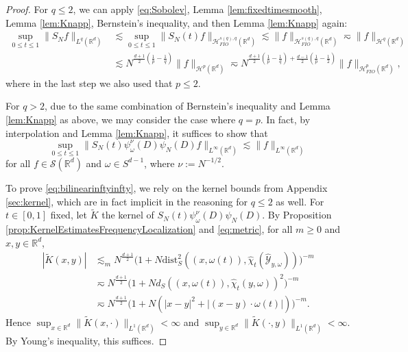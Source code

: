 \documentclass{amsart}
\numberwithin{equation}{section}
\theoremstyle{definition}
\newcommand{\R}{\mathbb{R}}
\newcommand{\Rd}{\mathbb{R}^{d}}
\newcommand {\HT}{\mathcal{H}}
\newcommand {\Sw}{\mathcal{S}}
\newcommand {\w}{\omega}
\begin{document}
\begin{proof}
For $q\leq 2$, we can apply \eqref{eq:Sobolev}, Lemma \ref{lem:fixedtimesmooth}, Lemma \ref{lem:Knapp}, Bernstein's inequality, and then Lemma \ref{lem:Knapp} again:
\begin{align*}
\sup_{0\leq t\leq 1}\| S_{N}f\|_{L^{q}(\R^d)}&\lesssim \sup_{0\leq t\leq 1}\| S_{N}(t)f\|_{\HT^{s(q),q}_{FIO}(\Rd)}\lesssim \|f\|_{\HT^{s(q),q}_{FIO}(\Rd)}\eqsim \|f\|_{\HT^{q}(\Rd)}\\
&\lesssim N^{\frac{d+1}{2}(\frac{1}{p}-\frac{1}{q})}\|f\|_{\HT^{p}(\Rd)}\eqsim N^{\frac{d+1}{2}(\frac{1}{p}-\frac{1}{q})+\frac{d-1}{2}(\frac{1}{p}-\frac{1}{2})}\|f\|_{\HT^{p}_{FIO}(\Rd)},
\end{align*}
where in the last step we also used that $p\leq 2$.

For $q>2$, due to the same combination of Bernstein's inequality and Lemma \ref{lem:Knapp} as above, we may
consider the case where $q=p$. In fact, by interpolation and Lemma \ref{lem:Knapp}, it suffices to show that
\begin{equation}\label{eq:bilinearinftyinfty}
\sup_{0\leq t\leq 1}\|S_{N}(t)\psi_{\omega}^{\nu}(D) \psi_N(D) f\|_{L^{\infty}(\Rd)}\lesssim \|f\|_{L^{\infty}(\Rd)}
\end{equation}
for all $f\in\Sw(\Rd)$ and $\w\in S^{d-1}$, where $\nu:=N^{-1/2}$. 

To prove \eqref{eq:bilinearinftyinfty}, we rely on the kernel bounds from Appendix \ref{sec:kernel}, which are in fact implicit in the reasoning for $q\leq 2$ as well.  
For $t\in[0,1]$ fixed, let $\tilde{K}$ the kernel of $S_{N}(t)\psi_{\omega}^{\nu}(D) \psi_N(D)$. By Proposition \ref{prop:KernelEstimatesFrequencyLocalization} and \eqref{eq:metric}, for all $m\geq 0$ and $x,y\in\Rd$,%
\begin{align*}
|\tilde{K}(x,y)|&\lesssim_{m} N^{\frac{d+1}{2}}\big(1+N\text{dist}_S^2((x,\omega(t)), \hat{\chi}_t(\hat{\mathcal{Y}}_{y,\omega}))\big)^{-m}\\
&\eqsim N^{\frac{d+1}{2}}\big(1+Nd_S((x,\omega(t)), \hat{\chi}_t(y,\omega))^{2}\big)^{-m}\\
&\eqsim N^{\frac{d+1}{2}}\big(1+N(|x-y|^{2}+|(x-y)\cdot\omega(t)|)\big)^{-m}.
\end{align*}
Hence $\sup_{x\in\Rd}\|\tilde{K}(x,\cdot)\|_{L^{1}(\Rd)}<\infty$ and $\sup_{y\in\Rd}\|\tilde{K}(\cdot,y)\|_{L^{1}(\Rd)}<\infty$. By Young's inequality, this suffices.

\end{proof}
\end{document}
